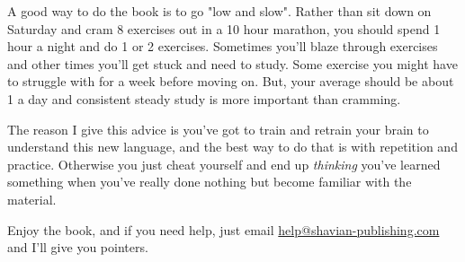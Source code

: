 A good way to do the book is to go "low and slow".  Rather than
sit down on Saturday and cram 8 exercises out in a 10 hour marathon,
you should spend 1 hour a night and do 1 or 2 exercises.  Sometimes
you'll blaze through exercises and other times you'll get stuck and
need to study.  Some exercise you might have to struggle with for
a week before moving on.  But, your average should be about 1 a day
and consistent steady study is more important than cramming.

The reason I give this advice is you've got to train and retrain
your brain to understand this new language, and the best way to
do that is with repetition and practice.  Otherwise you just cheat
yourself and end up \emph{thinking} you've learned something when
you've really done nothing but become familiar with the material.

Enjoy the book, and if you need help, just email \href{mailto:help@shavian-publishing.com}{help@shavian-publishing.com}
and I'll give you pointers.

